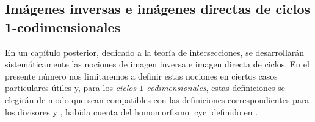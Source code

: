 \subsection{Imágenes inversas e imágenes directas de ciclos 1-codimensionales}
\label{subsection:IV.21.10}

En un capítulo posterior, dedicado a la teoría de intersecciones, se desarrollarán sistemáticamente las nociones de imagen inversa e imagen directa de ciclos.
En el presente número nos limitaremos a definir estas nociones en ciertos casos particulares útiles y, para los \emph{ciclos $1$-codimensionales}, estas definiciones se elegirán de modo que sean compatibles con las definiciones correspondientes para los divisores  y , habida cuenta del homomorfismo $\operatorname{cyc}$ definido en .

